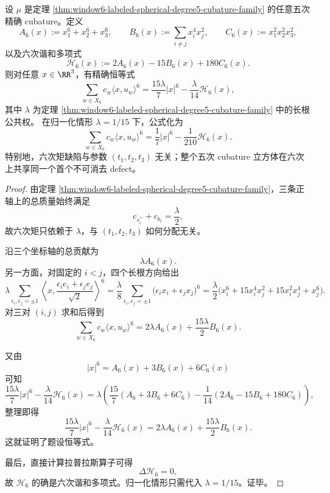 \begin{theorem}\label{thm:window6-labeled-spherical-degree6-harmonic-defect}
设 \(\mu\) 是定理 \ref{thm:window6-labeled-spherical-degree5-cubature-family} 的任意五次精确 cubature。定义
\[
A_6(x):=x_1^6+x_2^6+x_3^6,
\qquad
B_6(x):=\sum_{i\ne j}x_i^4x_j^2,
\qquad
C_6(x):=x_1^2x_2^2x_3^2,
\]
以及六次谐和多项式
\[
\mathscr H_6(x):=
2A_6(x)-15B_6(x)+180C_6(x).
\]
则对任意 \(x\in \RR^3\)，有精确恒等式
\[
\sum_{w\in X_6}c_w\langle x,u_w\rangle^6
=
\frac{15\lambda}{7}|x|^6-\frac{\lambda}{14}\mathscr H_6(x),
\]
其中 \(\lambda\) 为定理 \ref{thm:window6-labeled-spherical-degree5-cubature-family} 中的长根公共权。
在归一化情形 \(\lambda=1/15\) 下，公式化为
\[
\sum_{w\in X_6}c_w\langle x,u_w\rangle^6
=
\frac{1}{7}|x|^6-\frac{1}{210}\mathscr H_6(x).
\]
特别地，六次矩缺陷与参数 \((t_1,t_2,t_3)\) 无关；整个五次 cubature 立方体在六次上共享同一个首个不可消去 defect。
\end{theorem}
\begin{proof}
由定理 \ref{thm:window6-labeled-spherical-degree5-cubature-family}，三条正轴上的总质量始终满足
\[
c_{s_i^+}+c_{b_i}=\frac{\lambda}{2},
\]
故六次矩只依赖于 \(\lambda\)，与 \((t_1,t_2,t_3)\) 如何分配无关。

沿三个坐标轴的总贡献为
\[
\lambda A_6(x).
\]
另一方面，对固定的 \(i<j\)，四个长根方向给出
\[
\lambda\sum_{\epsilon_i,\epsilon_j=\pm 1}
\left\langle x,\frac{\epsilon_i e_i+\epsilon_j e_j}{\sqrt2}\right\rangle^{6}
=
\frac{\lambda}{8}
\sum_{\epsilon_i,\epsilon_j=\pm 1}
{\bigl(\epsilon_i x_i+\epsilon_j x_j\bigr)}^{6}
=
\frac{\lambda}{2}\bigl(x_i^6+15x_i^4x_j^2+15x_i^2x_j^4+x_j^6\bigr).
\]
对三对 \((i,j)\) 求和后得到
\[
\sum_{w\in X_6}c_w\langle x,u_w\rangle^6
=
2\lambda A_6(x)+\frac{15\lambda}{2}B_6(x).
\]

又由
\[
|x|^6=A_6(x)+3B_6(x)+6C_6(x)
\]
可知
\[
\frac{15\lambda}{7}|x|^6-\frac{\lambda}{14}\mathscr H_6(x)
=
\lambda\left(
\frac{15}{7}(A_6+3B_6+6C_6)-\frac{1}{14}(2A_6-15B_6+180C_6)
\right),
\]
整理即得
\[
\frac{15\lambda}{7}|x|^6-\frac{\lambda}{14}\mathscr H_6(x)
=
2\lambda A_6(x)+\frac{15\lambda}{2}B_6(x).
\]
这就证明了题设恒等式。

最后，直接计算拉普拉斯算子可得
\[
\Delta \mathscr H_6=0,
\]
故 \(\mathscr H_6\) 的确是六次谐和多项式。归一化情形只需代入 \(\lambda=1/15\)。证毕。
\end{proof}

